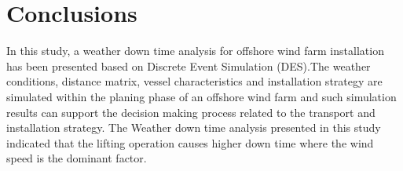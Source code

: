 \section{Conclusions}
In this study, a weather down time analysis for offshore wind farm installation  has been presented based on Discrete Event Simulation (DES).The weather conditions, distance matrix, vessel characteristics and installation strategy are simulated within the planing phase of an offshore wind farm and such simulation results can support the decision making process related to the transport and installation strategy. The Weather down time analysis presented in this study indicated that the lifting operation causes higher down time where the wind speed is the dominant factor. 
